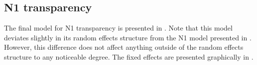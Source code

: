 \subsection{N1 transparency}
\label{sec:bellschaefer2016n1}


The final model for N1 transparency is presented in
. Note that this model
deviates slightly in its random effects structure from the N1 model
presented in \citet{BellandSchaefer:2016}. However, this difference
does not affect anything outside of the random effects structure to
any noticeable degree. The fixed effects are presented graphically in .





